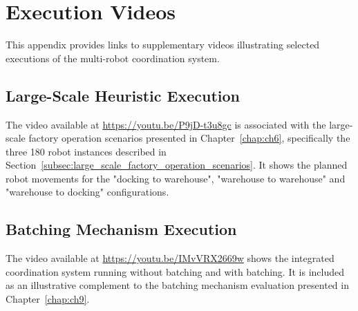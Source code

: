 \chapter{Execution Videos}
\label{app:execution_videos}
\hspace{\parindent}
This appendix provides links to supplementary videos illustrating selected executions of the
multi-robot coordination system.

\section{Large-Scale Heuristic Execution}
\label{app:large_scale_heuristics_video}
\hspace{\parindent}
The video available at \url{https://youtu.be/P9jD-t3u8gc} is associated with the large-scale factory
operation scenarios presented in Chapter~\ref{chap:ch6}, specifically the three
180 robot instances described in Section~\ref{subsec:large_scale_factory_operation_scenarios}. It
shows the planned robot movements for the "docking to warehouse", "warehouse to warehouse" and
"warehouse to docking" configurations.

\section{Batching Mechanism Execution}
\label{app:batching_video}
\hspace{\parindent}
The video available at \url{https://youtu.be/IMvVRX2669w} shows the integrated coordination
system running without batching and with batching. It is included as an illustrative complement to
the batching mechanism evaluation presented in Chapter~\ref{chap:ch9}.